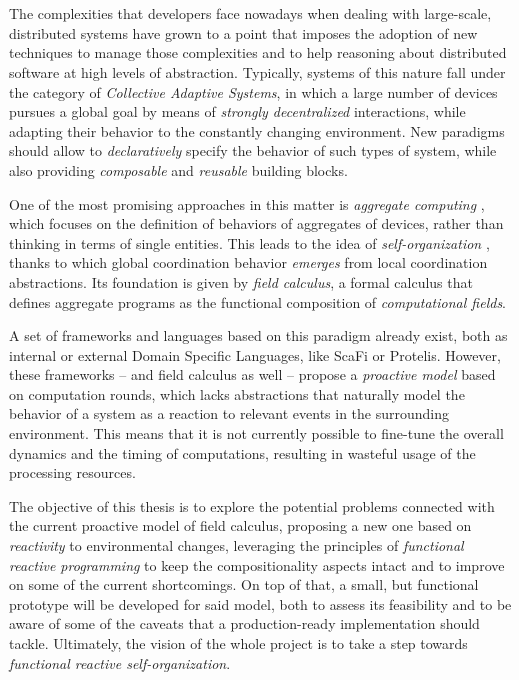 \chapter{\introductionname}

The complexities that developers face nowadays when dealing with large-scale, distributed systems have grown to a point that imposes the adoption of new techniques to manage those complexities and to help reasoning about distributed software at high levels of abstraction.
%
Typically, systems of this nature fall under the category of \textit{Collective Adaptive Systems}, in which a large number of devices pursues a global goal by means of \textit{strongly decentralized} interactions, while adapting their behavior to the constantly changing environment.
%
New paradigms should allow to \textit{declaratively} specify the behavior of such types of system, while also providing \textit{composable} and \textit{reusable} building blocks.

One of the most promising approaches in this matter is \textit{aggregate computing} \cite{VIROLI2019100486}, which focuses on the definition of behaviors of aggregates of devices, rather than thinking in terms of single entities.
%
This leads to the idea of \textit{self-organization} \cite{10.1145/3177774}, thanks to which global coordination behavior \textit{emerges} from local coordination abstractions.
%
Its foundation is given by \textit{field calculus}, a formal calculus that defines aggregate programs as the functional composition of \textit{computational fields}.

A set of frameworks and languages based on this paradigm already exist, both as internal or external Domain Specific Languages, like ScaFi or Protelis.
%
However, these frameworks -- and field calculus as well -- propose a \textit{proactive model} based on computation rounds, which lacks abstractions that naturally model the behavior of a system as a reaction to relevant events in the surrounding environment.
%
This means that it is not currently possible to fine-tune the overall dynamics and the timing of computations, resulting in wasteful usage of the processing resources.

The objective of this thesis is to explore the potential problems connected with the current proactive model of field calculus, proposing a new one based on \textit{reactivity} to environmental changes, leveraging the principles of \textit{functional reactive programming} \cite{blackheath2016functional} to keep the compositionality aspects intact and to improve on some of the current shortcomings.
%
On top of that, a small, but functional prototype will be developed for said model, both to assess its feasibility and to be aware of some of the caveats that a production-ready implementation should tackle.
%
Ultimately, the vision of the whole project is to take a step towards \textit{functional reactive self-organization}.

